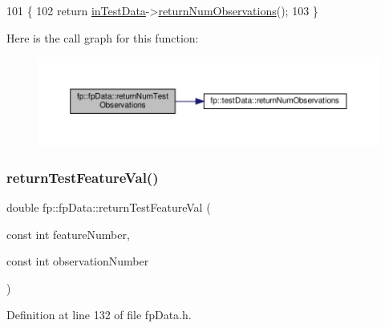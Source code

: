\begin{DoxyCode}
101                                                   \{
102                 \textcolor{keywordflow}{return} \hyperlink{classfp_1_1fpData_ad4f4dd3a8d15633b7f983932fa60bbad}{inTestData}->\hyperlink{classfp_1_1testData_af9dd7a4aa116d99a11838a02f2154c08}{returnNumObservations}();
103             \}
\end{DoxyCode}
Here is the call graph for this function\+:
\nopagebreak
\begin{figure}[H]
\begin{center}
\leavevmode
\includegraphics[width=350pt]{classfp_1_1fpData_a9a115d29fafb6e5b941f4e0c860e65e7_cgraph}
\end{center}
\end{figure}
\mbox{\label{classfp_1_1fpData_a42f76961f1649e329d654e9e1bb13fc6}} 
\subsubsection{\texorpdfstring{return\+Test\+Feature\+Val()}{returnTestFeatureVal()}}
{\footnotesize\ttfamily double fp\+::fp\+Data\+::return\+Test\+Feature\+Val (\begin{DoxyParamCaption}\item[{const int}]{feature\+Number,  }\item[{const int}]{observation\+Number }\end{DoxyParamCaption})\hspace{0.3cm}{\ttfamily [inline]}}



Definition at line 132 of file fp\+Data.\+h.


